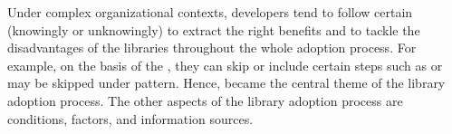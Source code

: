 Under complex organizational contexts, developers tend to follow certain {\principle} (knowingly or unknowingly) to extract the right benefits and to tackle the disadvantages of the libraries throughout the whole adoption process. For example, on the basis of the {\principle}, they can skip or include certain steps such as  or  may be skipped under  pattern. 
Hence, {\principle} became the central theme of the library adoption process. The other aspects of the library adoption process are conditions, factors, and information sources.  




